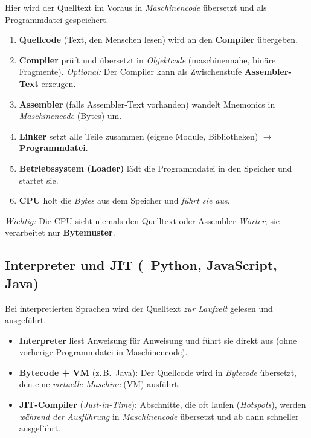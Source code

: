 \documentclass[../skript/main.tex]{subfiles}
\begin{document}
Hier wird der Quelltext im Voraus in \emph{Maschinencode} übersetzt und als Programmdatei gespeichert.
\begin{enumerate}
	\item \textbf{Quellcode} (Text, den Menschen lesen) wird an den \textbf{Compiler} übergeben.
	\item \textbf{Compiler} prüft und übersetzt in \emph{Objektcode} (maschinennahe, binäre Fragmente).
	\quad\emph{Optional:} Der Compiler kann als Zwischenstufe \textbf{Assembler-Text} erzeugen.
	\item \textbf{Assembler} (falls Assembler-Text vorhanden) wandelt Mnemonics in \emph{Maschinencode} (Bytes) um.
	\item \textbf{Linker} setzt alle Teile zusammen (eigene Module, Bibliotheken) \(\rightarrow\) \textbf{Programmdatei}.
	\item \textbf{Betriebssystem (Loader)} lädt die Programmdatei in den Speicher und startet sie.
	\item \textbf{CPU} holt die \emph{Bytes} aus dem Speicher und \emph{führt sie aus}.
\end{enumerate}
\emph{Wichtig:} Die CPU sieht niemals den Quelltext oder Assembler-\emph{Wörter}; sie verarbeitet nur \textbf{Byte\-muster}.

\subsection{Interpreter und JIT (\ZB\ Python, JavaScript, Java)}%
Bei interpretierten Sprachen wird der Quelltext \emph{zur Laufzeit} gelesen und ausgeführt.
\begin{itemize}
	\item \textbf{Interpreter} liest Anweisung für Anweisung und führt sie direkt aus (ohne vorherige Programmdatei in Maschinencode).
	\item \textbf{Bytecode + VM} (z.\,B.\ Java): Der Quellcode wird in \emph{Bytecode} übersetzt, den eine \emph{virtuelle Maschine} (VM) ausführt.
	\item \textbf{JIT-Compiler} (\emph{Just-in-Time}): Abschnitte, die oft laufen (\emph{Hotspots}), werden \emph{während der Ausführung} in \emph{Maschinencode} übersetzt und ab dann schneller ausgeführt.
\end{itemize}

\end{document}
